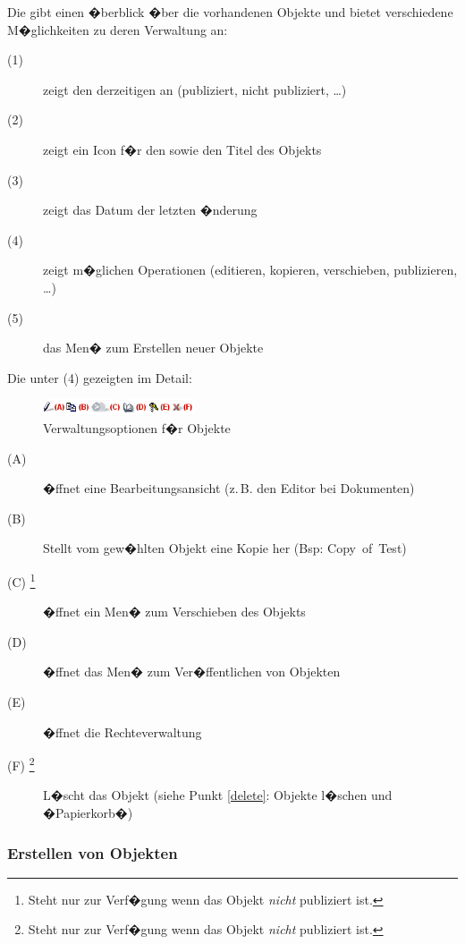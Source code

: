 Die  gibt einen �berblick �ber die
vorhandenen Objekte und bietet verschiedene M�glichkeiten zu deren
Verwaltung an:
\begin{description}
\item[(1)] zeigt den derzeitigen  an
  (publiziert, nicht publiziert, \dots)
\item[(2)] zeigt ein Icon f�r den  sowie den Titel
  des Objekts
\item[(3)] zeigt das Datum der letzten �nderung
\item[(4)] zeigt m�glichen Operationen (editieren, kopieren,
  verschieben, publizieren, \dots)
\item[(5)] das Men� zum Erstellen neuer Objekte
\end{description}

\clearpage %

Die unter (4) gezeigten  im Detail:

\begin{figure}[H]
  \centering
  \includegraphics[width=0.4\textwidth]{./images/XI5S-optionsicons.png}
  \caption{Verwaltungsoptionen f�r Objekte}
  \label{fig:optionsicons}
\end{figure}

\begin{description}
\item[(A) ] �ffnet eine Bearbeitungsansicht
  (z.\,B. den Editor bei Dokumenten)
\item[(B) ] Stellt vom gew�hlten Objekt eine Kopie
  her (Bsp: Copy~of~Test)
\item[(C) \footnote{Steht nur zur Verf�gung
    wenn das Objekt \emph{nicht} publiziert ist.}] �ffnet ein Men� zum
  Verschieben des Objekts
\item[(D) ] �ffnet das Men� zum Ver�ffentlichen
  von Objekten
\item[(E) ] �ffnet die Rechteverwaltung
\item[(F) \footnote{Steht nur zur Verf�gung wenn
    das Objekt \emph{nicht} publiziert ist.}] L�scht das Objekt (siehe
  Punkt \ref{delete}: Objekte l�schen und �Papierkorb�)
\end{description}

\subsubsection{Erstellen von Objekten}
\label{quick-erstellen}


